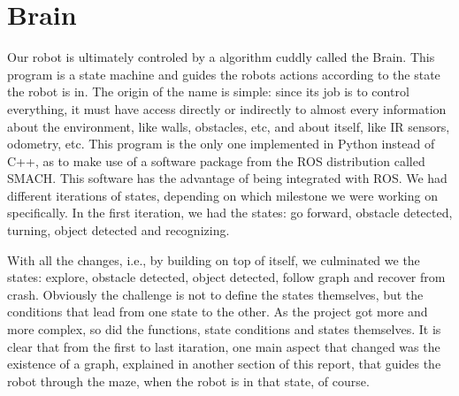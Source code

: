 \section{Brain}

Our robot is ultimately controled by a algorithm cuddly called the Brain.
This program is a state machine and guides the robots actions according to the state the robot is in.
The origin of the name is simple: since its job is to control everything, it must have access directly or indirectly to almost every information about the environment, like walls, obstacles, etc, and about itself, like IR sensors, odometry, etc.
This program is the only one implemented in Python instead of C++, as to make use of a software package from the ROS distribution called SMACH.
This software has the advantage of being integrated with ROS. 
We had different iterations of states, depending on which milestone we were working on specifically.
In the first iteration, we had the states: go forward, obstacle detected, turning, object detected and recognizing.


With all the changes, i.e., by building on top of itself, we culminated we the states: explore, obstacle detected, object detected, follow graph and recover from crash.
Obviously the challenge is not to define the states themselves, but the conditions that lead from one state to the other.
As the project got more and more complex, so did the functions, state conditions and states themselves.
It is clear that from the first to last itaration, one main aspect that changed was the existence of a graph, explained in another section of this report, that guides the robot through the maze, when the robot is in that state, of course.

